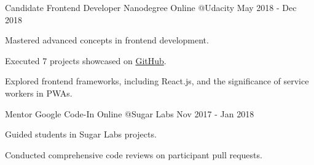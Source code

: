 
\begin{cventries}

  \cventry
    {Candidate}
    {Frontend Developer Nanodegree}
    {Online @Udacity}
    {May 2018 - Dec 2018}
    {
      \begin{cvitems}
        \item {Mastered advanced concepts in frontend development.}
        \item {Executed 7 projects showcased on \href{https://github.com/lalitmee?tab=repositories\&q=ud-\&type=source\&language=\&sort=}{GitHub}.}
        \item {Explored frontend frameworks, including React.js, and the significance of service workers in PWAs.}
      \end{cvitems}
    }

  \cventry
    {Mentor}
    {Google Code-In}
    {Online @Sugar Labs}
    {Nov 2017 - Jan 2018}
    {
      \begin{cvitems}
        \item {Guided students in Sugar Labs projects.}
        \item {Conducted comprehensive code reviews on participant pull requests.}
      \end{cvitems}
    }


\end{cventries}

